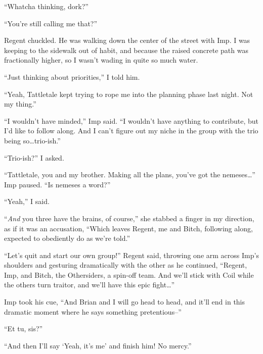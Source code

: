 ``Whatcha thinking, dork?''



``You're still calling me that?''



Regent chuckled.  He was walking down the center of the street with Imp.  I was keeping to the sidewalk out of habit, and because the raised concrete path was fractionally higher, so I wasn't wading in quite so much water.



``Just thinking about priorities,'' I told him.



``Yeah, Tattletale kept trying to rope me into the planning phase last night.  Not my thing.''



``I wouldn't have minded,'' Imp said.  ``I wouldn't have anything to contribute, but I'd like to follow along.  And I can't figure out my niche in the group with the trio being so\ldots trio-ish.''



``Trio-ish?'' I asked.



``Tattletale, you and my brother.  Making all the plans, you've got the nemeses\ldots'' Imp paused.  ``Is nemeses a word?''



``Yeah,'' I said.



``\emph{And} you three have the brains, of course,'' she stabbed a finger in my direction, as if it was an accusation, ``Which leaves Regent, me and Bitch, following along, expected to obediently do as we're told.''



``Let's quit and start our own group!''  Regent said, throwing one arm across Imp's shoulders and gesturing dramatically with the other as he continued, ``Regent, Imp, and Bitch, the Othersiders, a spin-off team.  And we'll stick with Coil while the others turn traitor, and we'll have this epic fight\ldots''



Imp took his cue, ``And Brian and I will go head to head, and it'll end in this dramatic moment where he says something pretentious--''



``Et tu, sis?''



``And then I'll say `Yeah, it's me' and finish him!  No mercy.''



